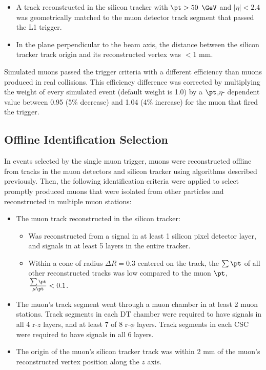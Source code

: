 \begin{itemize}
	\item A track reconstructed in the silicon tracker with $\pt > 50$ $\GeV$ and $|\eta| < 2.4$ was geometrically matched to 
		the muon detector track segment that passed the L1 trigger.
	\item In the plane perpendicular to the beam axis, the distance between the silicon tracker track origin and its 
		reconstructed vertex was $< 1$ mm.
\end{itemize}

Simulated muons passed the trigger criteria with a different efficiency than muons produced in real collisions.  This 
efficiency difference was corrected by multiplying the weight of every simulated event (default weight is 1.0) by a $\pt$,$\eta$-
dependent value between 0.95 (5\% decrease) and 1.04 (4\% increase) for the muon that fired the trigger.

\subsection{Offline Identification Selection}
In events selected by the single muon trigger, muons were reconstructed offline from tracks in the muon detectors and silicon tracker using 
algorithms described previously.  Then, the following identification criteria were applied to select promptly produced muons 
that were isolated from other particles and reconstructed in multiple muon stations:

\begin{itemize}
	\item The muon track reconstructed in the silicon tracker:
	\begin{itemize}
		\item Was reconstructed from a signal in at least 1 silicon pixel detector layer, and signals in at least 
			5 layers in the entire tracker.
		\item Within a cone of radius $\Delta R = 0.3$ centered on the track, the $\sum \pt$ of all other 
			reconstructed tracks was low compared to the muon $\pt$, $\frac{\sum \pt}{\mu \pt} < 0.1$.
	\end{itemize}
	\item The muon's track segment went through a muon chamber in at least 2 muon stations.  Track segments in each DT 
		chamber were required to have signals in all 4 r-$z$ layers, and at least 7 of 8 r-$\phi$ layers.  Track segments 
		in each CSC were required to have signals in all 6 layers.
	\item The origin of the muon's silicon tracker track was within 2 mm of the muon's reconstructed vertex 
		position along the $z$ axis.
\end{itemize}

